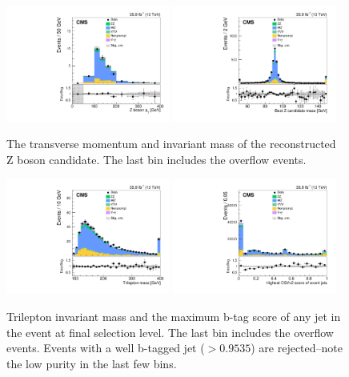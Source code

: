 \clearpage
\begin{figure}[!t]
\centering
\includegraphics[width=0.48\textwidth]{figures/dibosons/wz3l/pTZ.pdf}
\includegraphics[width=0.48\textwidth]{figures/dibosons/wz3l/minMassZ_Nminus1.pdf}
\caption{The transverse momentum and invariant mass of the reconstructed Z boson candidate.
The last bin includes the overflow events.
\label{fig:wz3l_z}}
\end{figure}

\begin{figure}[!hb]
\centering
\includegraphics[width=0.48\textwidth]{figures/dibosons/wz3l/m3l_Nminus1.pdf}
\includegraphics[width=0.48\textwidth]{figures/dibosons/wz3l/bDiscrMax_Nminus1.pdf}
\caption{Trilepton invariant mass and the maximum b-tag score of any jet in the event
at final selection level.
The last bin includes the overflow events.
Events with a well b-tagged jet ($>0.9535$) are rejected--note the low purity in the last few bins.
\label{fig:wz3l_purity}}
\end{figure}

